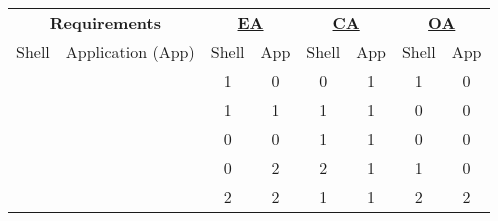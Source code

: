 \begin{table}
    \setlength{\tabcolsep}{5pt} %
    \begin{tabular}{|c|l|cc|cc|cc|}
        \multicolumn{2}{|c|}{\textbf{Requirements}}                                    &
        \multicolumn{2}{c|}{\textbf{\hyperref[cha:evaluation_enterprise]{EA}}}         &
        \multicolumn{2}{c|}{\textbf{\hyperref[cha:evaluation_consumer]{CA}}}           &
        \multicolumn{2}{c|}{\textbf{\hyperref[cha:evaluation_offshelf]{OA}}}
        \\
        Shell                                                                          &
        \multicolumn{1}{c|}{Application (App)}                                         &
        \multicolumn{1}{c|}{Shell}                                                     &
        App                                                                            &
        \multicolumn{1}{c|}{Shell}                                                     &
        App                                                                            &
        \multicolumn{1}{c|}{Shell}                                                     &
        App
        \\ \hline
        \multicolumn{2}{|c|}{\nameref{cha:requirement_detail_integration_pagelayout}}  &
        1                                                                              & 0          & 0          & 1          & 1          & 0                       \\
        \multicolumn{2}{|c|}{\nameref{cha:requirement_detail_integration_widget}}      &
        1                                                                              & 1          & 1          & 1          & 0          & 0                       \\
        \multicolumn{2}{|c|}{\nameref{cha:requirement_detail_integration_abstraction}} &
        0                                                                              & 0          & 1          & 1          & 0          & 0                       \\
        \multicolumn{2}{|c|}{\nameref{cha:requirement_detail_state_exchange}}          &
        0                                                                              & 2          & 2          & 1          & 1          & 0                       \\
        \multicolumn{2}{|c|}{\nameref{cha:requirement_detail_integration_sharedlogic}} &
        2                                                                              & 2          & 1          & 1          & 2          & 2                       \\

\end{tabular}
\end{table}
